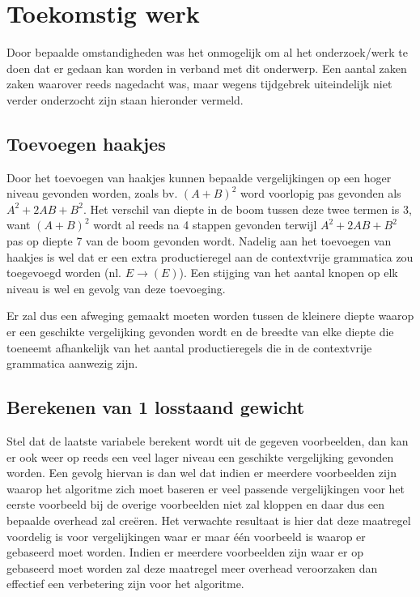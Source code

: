 \documentclass[Main.tex]{subfiles}
\begin{document}
\section{Toekomstig werk}
Door bepaalde omstandigheden was het onmogelijk om al het onderzoek/werk te doen dat er gedaan kan worden in verband met dit onderwerp. Een aantal zaken zaken waarover reeds nagedacht was, maar wegens tijdgebrek uiteindelijk niet verder onderzocht zijn staan hieronder vermeld.

\subsection{Toevoegen haakjes}
Door het toevoegen van haakjes kunnen bepaalde vergelijkingen op een hoger niveau gevonden worden, zoals bv. $(A+B)^2$ word voorlopig pas gevonden als $A^{2}+2AB+B^{2}$. Het verschil van diepte in de boom tussen deze twee termen is 3, want $(A+B)^2$ wordt al reeds na 4 stappen gevonden terwijl $A^{2}+2AB+B^{2}$ pas op diepte 7 van de boom gevonden wordt. Nadelig aan het toevoegen van haakjes is wel dat er een extra productieregel aan de contextvrije grammatica zou toegevoegd worden (nl. $E \rightarrow (E)$). Een stijging van het aantal knopen op elk niveau is wel en gevolg van deze toevoeging.

Er zal dus een afweging gemaakt moeten worden tussen de kleinere diepte waarop er een geschikte vergelijking gevonden wordt en de breedte van elke diepte die toeneemt afhankelijk van het aantal productieregels die in de contextvrije grammatica aanwezig zijn.

\subsection{Berekenen van 1 losstaand gewicht}
Stel dat de laatste variabele berekent wordt uit de gegeven voorbeelden, dan kan er ook weer op reeds een veel lager niveau een geschikte vergelijking gevonden worden. Een gevolg hiervan is dan wel dat indien er meerdere voorbeelden zijn waarop het algoritme zich moet baseren er veel passende vergelijkingen voor het eerste voorbeeld bij de overige voorbeelden niet zal kloppen en daar dus een bepaalde overhead zal cre\"eren. Het verwachte resultaat is hier dat deze maatregel voordelig is voor vergelijkingen waar er maar \'e\'en voorbeeld is waarop er gebaseerd moet worden. Indien er meerdere voorbeelden zijn waar er op gebaseerd moet worden zal deze maatregel meer overhead veroorzaken dan effectief een verbetering zijn voor het algoritme. 

\end{document}
